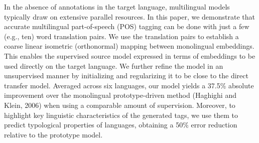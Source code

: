 In the absence of annotations in the target language, multilingual models typically draw on extensive parallel resources. In this paper, we demonstrate that accurate multilingual part-of-speech (POS) tagging can be done with just a few (e.g., ten) word translation pairs. We use the translation pairs to establish a coarse linear isometric (orthonormal) mapping between monolingual embeddings. This enables the supervised source model expressed in terms of embeddings to be used directly on the target language. We further refine the model in an unsupervised manner by initializing and regularizing it to be close to the direct transfer model. Averaged across six languages, our model yields a 37.5\% absolute improvement over the monolingual prototype-driven method (Haghighi and Klein, 2006) when using a comparable amount of supervision. Moreover, to highlight key linguistic characteristics of the generated tags, we use them to predict typological properties of languages, obtaining a 50\% error reduction relative to the prototype model.
